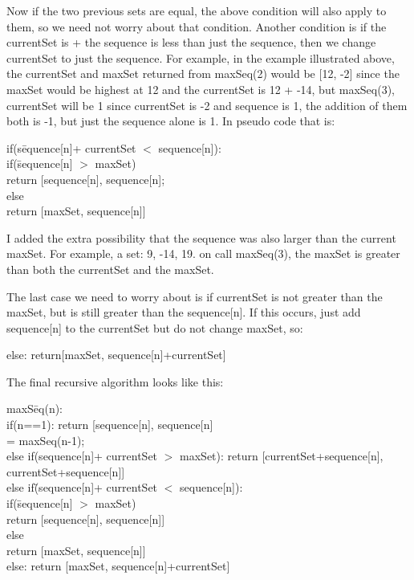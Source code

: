 \documentclass{article}
\begin{document}
\begin{enumerate}
Now if the two previous sets are equal, the above condition will also apply to them, so we need not worry about that condition. Another condition is if the currentSet is + the sequence is less than just the sequence, then we change currentSet to just the sequence. For example, in the example illustrated above, the currentSet and maxSet returned from maxSeq(2) would be [12, -2] since the maxSet would be highest at 12 and the currentSet is 12 + -14, but maxSeq(3), currentSet will be 1 since currentSet is -2 and sequence is 1, the addition of them both is -1, but just the sequence alone is 1. In pseudo code that is:
\begin{tabbing}
if(s\=equence[n]+ currentSet $<$ sequence[n]):\\
\>	if(\=sequence[n] $>$ maxSet)\\
\>\>	return [sequence[n], sequence[n];\\
\>	else\\
\>\>	return [maxSet, sequence[n]]\\
\end{tabbing}
I added the extra possibility that the sequence was also larger than the current maxSet. For example, a set: 9, -14, 19. on call maxSeq(3), the maxSet is greater than both the currentSet and the maxSet.

The last case we need to worry about is if currentSet is not greater than the maxSet, but is still greater than the sequence[n]. If this occurs, just add sequence[n] to the currentSet but do not change maxSet, so:

else:
  return[maxSet, sequence[n]+currentSet]

The final recursive algorithm looks like this:
\begin{tabbing}
maxS\=eq(n):\\
\>if(n==1): return [sequence[n], sequence[n]\\
 = maxSeq(n-1);\\
\>else if(sequence[n]+ currentSet $>$ maxSet): return [currentSet+sequence[n], currentSet+sequence[n]]\\
\>else if\=(sequence[n]+ currentSet $<$ sequence[n]):\\
\>\>	if(\=sequence[n] $>$ maxSet)\\
\>\>\>	return [sequence[n], sequence[n]]\\
\>\>	else\\
\>\>\>		return [maxSet, sequence[n]]\\
\>else: return [maxSet, sequence[n]+currentSet]\\
\end{tabbing}


\end{enumerate}
\end{document}
